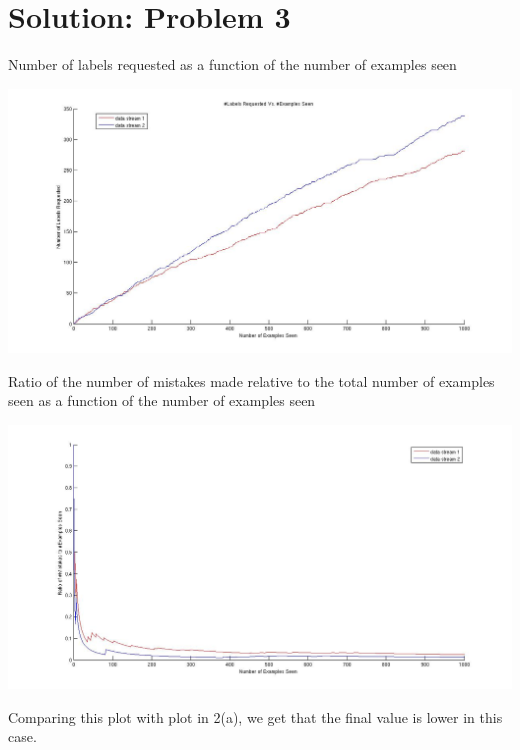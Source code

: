 \documentclass[twoside,10pt,a4paper]{article}
\theoremstyle{definition}
\theoremstyle{definition}
\theoremstyle{remark}
\renewcommand{\>}{{\rightarrow}}
\newcommand{\1}{{\mathbf 1}}
\newcommand{\0}{{\mathbf 0}}
\begin{document}
\newpage

\section{Solution: Problem 3}
Number of labels requested as a function of the number of examples seen\\
\begin{center}
 \includegraphics[scale=0.35]{./finale/3a1.jpg}
\end{center}

Ratio of the number of mistakes made relative to the total number of examples seen as a function of the number of examples seen\\
\begin{center}
 \includegraphics[scale=0.35]{./finale/3a2.jpg}
\end{center}
Comparing this plot with plot in 2(a), we get that the final value is lower in this case.

\newpage
\end{document}
